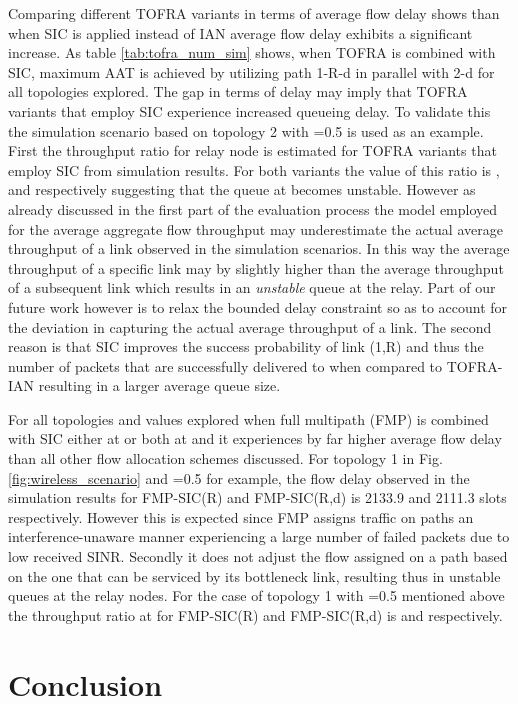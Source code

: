 \documentclass[conference]{IEEEtran}
\begin{document}
Comparing different TOFRA variants in terms of average flow delay shows than when SIC is applied instead of IAN average flow delay
exhibits a significant increase. As table \ref{tab:tofra_num_sim} shows, when TOFRA is combined with SIC, maximum AAT is achieved
by utilizing path 1-R-d in parallel with 2-d for all topologies explored.
The gap in terms of delay may imply that TOFRA variants that employ SIC experience increased queueing delay.
To validate this the simulation scenario based on topology 2 with =0.5 is used as an example.
First the throughput ratio for relay node  is estimated for TOFRA variants that employ SIC from simulation results.
For both variants the value of this ratio is , and  respectively  suggesting that the queue at  becomes unstable.
However as already discussed in the first part of the evaluation process the model
employed for the average aggregate flow throughput may underestimate the actual average throughput of a link observed in the simulation scenarios.
In this way the average throughput of a specific link may by slightly higher than the average throughput of a subsequent link which
results in an \textit{unstable} queue at the relay. Part of our future work however is to relax the bounded delay constraint so as
to account for the deviation in capturing the actual average throughput of a link.
The second reason is that SIC improves the success probability of link (1,R) and thus the number of packets that are successfully
delivered to  when compared to TOFRA-IAN resulting in a larger average queue size.

For all topologies and  values explored when full multipath (FMP) is combined with SIC either at 
or both at  and  it experiences by far higher average flow delay than all other flow allocation schemes discussed.
For topology 1 in Fig. \ref{fig:wireless_scenario} and =0.5 for example, the flow delay observed in the simulation
results for FMP-SIC(R) and FMP-SIC(R,d) is 2133.9 and 2111.3 slots respectively.
However this is expected since FMP assigns traffic on paths an interference-unaware manner experiencing a large number of
failed packets due to low received SINR. Secondly it does not adjust the flow assigned on a path based on the one that can
be serviced by its bottleneck link, resulting thus in unstable queues at the relay nodes.
For the case of topology 1 with =0.5 mentioned above the throughput ratio at  for FMP-SIC(R) and FMP-SIC(R,d)
is  and  respectively.

\section{Conclusion}
\end{document}
